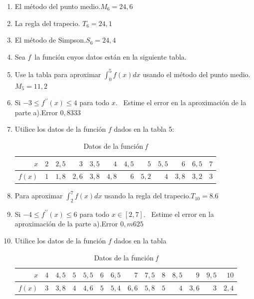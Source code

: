 \begin{enumerate}
	
\item {El método del punto medio.}{$M_{6}=24,6$ }

\item {La regla del trapecio.}{ $T_{6}=24,1$}

\item {El método de Simpson.}{$S_{6}=24,4$}

\item {Sea $f$\ la función cuyos datos están en la siguiente tabla.}

\item {Use la tabla para aproximar $\displaystyle\int_{0}^{5}f\left( x\right) dx$ usando el método del punto medio.}{$M_{5}=11,2$}

\item {Si $-3\leq f^{\prime \prime}\left( x\right) \leq 4$ para todo $x.$ \ Estime el error en la aproximación de la parte a).}{Error $0,8333$ }



\item {Utilice los datos de la función $f$ dados en la tabla 5:

\begin{table}[H]
\caption{Datos de la función \textit{f}}
\begin{tabular}{|r|r|r|r|r|r|r|r|r|r|r|r|}
 \hline
 $x$ & $2$ & $2,5$ & $3$ & $3,5$ & $4$ & $4,5$ & $5$ & $5,5$ & $6$ & $6,5$ & $%
 7$ \\ \hline
 $f\left( x\right) $ & $1$ & $1,8$ & $2,6$ & $3,8$ & $4,8$ & $6$ & $5,2$ & $4$
 & $3,8$ & $3,2$ & $3$ \\
\hline
\end{tabular}
\propia
\end{table}}

\item {Para aproximar $\displaystyle\int_{2}^{7}f\left( x\right) dx$ usando la regla del trapecio.}{$T_{10}=\num{8.6}$}

\item {Si $-4\leq f^{\prime \prime}\left( x\right) \leq 6$ para todo $x\in \left[ 2,7\right].$ \ Estime el error en la aproximación de la parte a).}{Error $0,m625$}



\item {Utilice los datos de la función $f$ dados en la tabla

\begin{table}[H]
\caption{Datos de la función \textit{f}}
\begin{tabular}{|r|r|r|r|r|r|r|r|r|r|r|r|r|r|}
 \hline
 $x$ & $4$ & $4,5$ & $5$ & $5,5$ & $6$ & $6,5$ & $7$ & $7,5$ & $8$ & $8,5$ & $%
 9$ & $9,5$ & $10$ \\ \hline
 $f\left( x\right) $ & $3$ & $3,8$ & $4$ & $4,6$ & $5$ & $5,4$ & $6,6$ & $5,8$
 & $5$ & $4$ & $3,6$ & $3$ & $2,4$ \\ \hline
\end{tabular}
\propia
\end{table}}


\end{enumerate}
